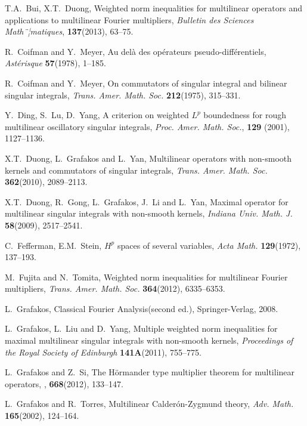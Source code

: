 \documentclass[11pt,oneside,onecolumn]{amsart}
\numberwithin{equation}{section}
\begin{document}
\begin{thebibliography}{EEE}
T.A.~Bui, X.T.~Duong,
Weighted norm inequalities for multilinear operators
and applications to multilinear Fourier multipliers,
\textit{Bulletin des Sciences Math¨¦matiques},
\textbf{137}(2013), 63--75.

R.~Coifman and Y.~Meyer,
Au del\`{a} des op\'{e}rateurs pseudo-diff\'{e}rentiels,
\textit{Ast\'{e}risque}
\textbf{57}(1978), 1--185.

R.~Coifman and Y.~Meyer,
On commutators of singular integral and bilinear singular integrals,
\textit{Trans. Amer. Math. Soc.}
\textbf{212}(1975), 315--331.

Y.~Ding,  S.~Lu, D.~Yang,
A criterion on weighted $L^p$ boundedness for rough multilinear oscillatory singular integrals,
\textit{Proc. Amer. Math. Soc.},
\textbf{129} (2001),  1127--1136.

X.T.~Duong, L.~Grafakos and L.~Yan,
Multilinear operators with non-smooth kernels and commutators of singular integrals,
\textit{Trans. Amer. Math. Soc.}
\textbf{362}(2010), 2089--2113.

X.T.~Duong, R.~Gong, L.~Grafakos, J.~Li and L.~Yan,
Maximal operator for multilinear singular integrals with non-smooth kernels,
\textit{Indiana Univ. Math. J.}
\textbf{58}(2009), 2517--2541.

C.~Fefferman, E.M.~Stein,
$H^p$ spaces of several variables,
\textit{Acta Math.}
\textbf{129}(1972), 137--193.

M.~Fujita and N.~Tomita,
Weighted norm inequalities for multilinear Fourier multipliers,
\textit{Trans. Amer. Math. Soc.}
\textbf{364}(2012), 6335--6353.

L.~Grafakos,
Classical Fourier Analysis(second ed.),
Springer-Verlag, 2008.

L.~Grafakos, L.~Liu and D.~Yang,
Multiple weighted norm inequalities for maximal multilinear singular integrals with non-smooth kernels,
\textit{Proceedings of the Royal Society of Edinburgh}
\textbf{141A}(2011), 755--775.

L.~Grafakos and Z.~Si,
The H\"{o}rmander type multiplier theorem for multilinear
operators,
,
\textbf{668}(2012), 133--147.

L.~Grafakos and R.~Torres,
Multilinear Calder\'{o}n-Zygmund theory,
\textit{Adv. Math.}
\textbf{165}(2002), 124--164.


\end{thebibliography}
\end{document}
